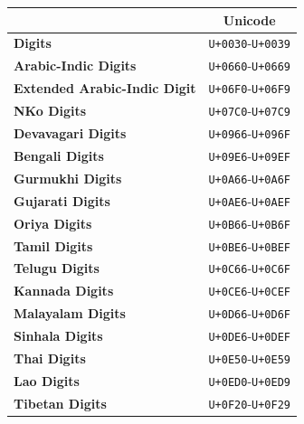 \documentclass [10pt]{article}
\begin{document}
\begin{center}
  \begin{tabular}{|l|c|}
    \hline
    & \textbf{Unicode} \\ \hline
    \textbf{Digits} & \texttt{U+0030}-\texttt{U+0039} \\ \hline
    \textbf{Arabic-Indic Digits} & \texttt{U+0660}-\texttt{U+0669} \\ \hline
    \textbf{Extended Arabic-Indic Digit}
    & \texttt{U+06F0}-\texttt{U+06F9} \\ \hline
    \textbf{NKo Digits} & \texttt{U+07C0}-\texttt{U+07C9} \\ \hline
    \textbf{Devavagari Digits} & \texttt{U+0966}-\texttt{U+096F} \\ \hline
    \textbf{Bengali Digits} & \texttt{U+09E6}-\texttt{U+09EF} \\ \hline
    \textbf{Gurmukhi Digits} & \texttt{U+0A66}-\texttt{U+0A6F} \\ \hline
    \textbf{Gujarati Digits} & \texttt{U+0AE6}-\texttt{U+0AEF} \\ \hline
    \textbf{Oriya Digits} & \texttt{U+0B66}-\texttt{U+0B6F} \\ \hline
    \textbf{Tamil Digits} & \texttt{U+0BE6}-\texttt{U+0BEF} \\ \hline
    \textbf{Telugu Digits} & \texttt{U+0C66}-\texttt{U+0C6F} \\ \hline
    \textbf{Kannada Digits} & \texttt{U+0CE6}-\texttt{U+0CEF} \\ \hline
    \textbf{Malayalam Digits} & \texttt{U+0D66}-\texttt{U+0D6F} \\ \hline
    \textbf{Sinhala Digits} & \texttt{U+0DE6}-\texttt{U+0DEF} \\ \hline
    \textbf{Thai Digits} & \texttt{U+0E50}-\texttt{U+0E59} \\ \hline
    \textbf{Lao Digits} & \texttt{U+0ED0}-\texttt{U+0ED9} \\ \hline
    \textbf{Tibetan Digits} & \texttt{U+0F20}-\texttt{U+0F29} \\ \hline
    \end{tabular}
\end{center}
\end{document}
